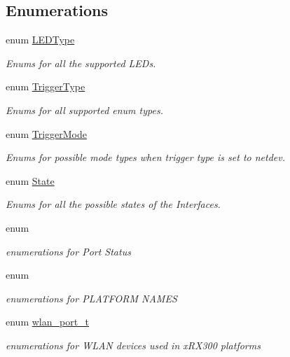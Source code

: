\subsection*{Enumerations}
\begin{DoxyCompactItemize}
\item 
enum \hyperlink{group__FAPI__SYSTEM_ga5f99aa5077acffebe451d1268c69db58}{L\-E\-D\-Type} 
\begin{DoxyCompactList}\small\item\em Enums for all the supported L\-E\-Ds. \end{DoxyCompactList}\item 
enum \hyperlink{group__FAPI__SYSTEM_ga59b7f49353f2a99b6c22d2eaae0fe9e9}{Trigger\-Type} 
\begin{DoxyCompactList}\small\item\em Enums for all supported enum types. \end{DoxyCompactList}\item 
enum \hyperlink{group__FAPI__SYSTEM_gaa534ed76b07c3983382a53e00e53e94a}{Trigger\-Mode} 
\begin{DoxyCompactList}\small\item\em Enums for possible mode types when trigger type is set to netdev. \end{DoxyCompactList}\item 
enum \hyperlink{group__FAPI__SYSTEM_ga5d74787dedbc4e11c1ab15bf487e61f8}{State} 
\begin{DoxyCompactList}\small\item\em Enums for all the possible states of the Interfaces. \end{DoxyCompactList}\item 
enum 
\begin{DoxyCompactList}\small\item\em enumerations for Port Status \end{DoxyCompactList}\item 
enum 
\begin{DoxyCompactList}\small\item\em enumerations for P\-L\-A\-T\-F\-O\-R\-M N\-A\-M\-E\-S \end{DoxyCompactList}\item 
enum \hyperlink{group__FAPI__SYSTEM_ga88c1a5d588bb04b1e58c5d9b22764488}{wlan\-\_\-port\-\_\-t} 
\begin{DoxyCompactList}\small\item\em enumerations for W\-L\-A\-N devices used in x\-R\-X300 platforms \end{DoxyCompactList}\item 

\end{DoxyCompactItemize}
